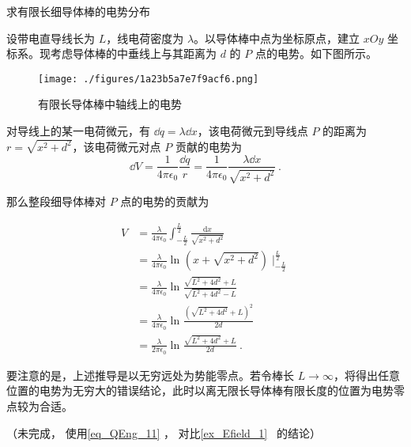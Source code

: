\begin{example}{求有限长细导体棒的电势分布}

设带电直导线长为 $L$，线电荷密度为 $\lambda$。以导体棒中点为坐标原点，建立 $xOy$ 坐标系。现考虑导体棒的中垂线上与其距离为 $d$ 的 $P$ 点的电势。如下图所示。

\begin{figure}[ht]
\centering
\texttt{[image: ./figures/1a23b5a7e7f9acf6.png]}
\caption{有限长导体棒中轴线上的电势} \label{fig_QEng_2}
\end{figure}

对导线上的某一电荷微元，有 $\dd q=\lambda \dd x$，该电荷微元到导线点 $P$ 的距离为 $r=\sqrt{x^2+d^2}$，该电荷微元对点 $P$ 贡献的电势为
\begin{equation}
\dd V=\frac{1}{4\pi \epsilon_0}\frac{\dd q}{r}=\frac{1}{4\pi \epsilon_0}\frac{\lambda \dd x}{\sqrt{x^2+d^2}}~.
\end{equation}

那么整段细导体棒对 $P$ 点的电势的贡献为

\begin{equation}
\begin{aligned}
V &=\frac{\lambda }{4 \pi \epsilon_{0}}\int_{-\frac{L}{2}}^{\frac{L}{2}}\frac{\mathrm{d} x}{\sqrt{x^{2}+d^{2}}}\\
&=\frac{\lambda }{4 \pi \epsilon_{0}}\ln_{}{(x+\sqrt{x^2+d^2})}\mid_{-\frac{L}{2}}^{\frac{L}{2}}\\
&=\frac{\lambda }{4 \pi \epsilon_{0}}\ln_{}{\frac{\sqrt{L^2+4d^2}+L}{\sqrt{L^2+4d^2}-L}}\\
&=\frac{\lambda }{4 \pi \epsilon_{0}}\ln_{}{\frac{(\sqrt{L^2+4d^2}+L)^2}{2d}}\\
&=\frac{\lambda }{2 \pi \epsilon_{0}}\ln_{}{\frac{\sqrt{L^2+4d^2}+L}{2d}}~.
\end{aligned}
\end{equation}


要注意的是，上述推导是以无穷远处为势能零点。若令棒长 $L\rightarrow \infty$，将得出任意位置的电势为无穷大的错误结论，此时以离无限长导体棒有限长度的位置为电势零点较为合适。

（未完成， 使用\autoref{eq_QEng_11} ， 对比\autoref{ex_Efield_1}~ 的结论）

\end{example}

